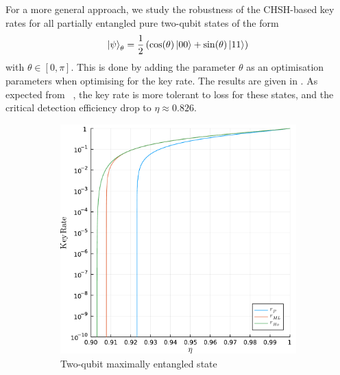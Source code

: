 For a more general approach, we study the robustness of the CHSH-based key rates for all partially entangled pure two-qubit states of the form
\begin{equation}
	\ket{\psi}_\theta = \frac{1}{2}\left(\cos(\theta)\ket{00}+\sin(\theta)\ket{11}\right)
	\label{eq:partiallyentangled}
\end{equation}
with $\theta\in[0,\pi]$.
This is done by adding the parameter $\theta$ as an optimisation parameters when optimising for the key rate.
The results are given in .
As expected from ~\cite{Eberhard1993}, the key rate is more tolerant to loss for these states, and the critical detection efficiency drop to $\eta\approx 0.826$.

\begin{figure}
     \centering
     \begin{subfigure}[b]{0.72\textwidth}
         \centering
         \includegraphics[width=\textwidth]{chapters/deviceindependent/img/key_rate_singlet.pdf}
         \caption{Two-qubit maximally entangled state}
         \label{fig:kr_singlet}
     \end{subfigure}
     \begin{subfigure}[b]{0.72\textwidth}
         \centering

\end{subfigure}
\end{figure}
